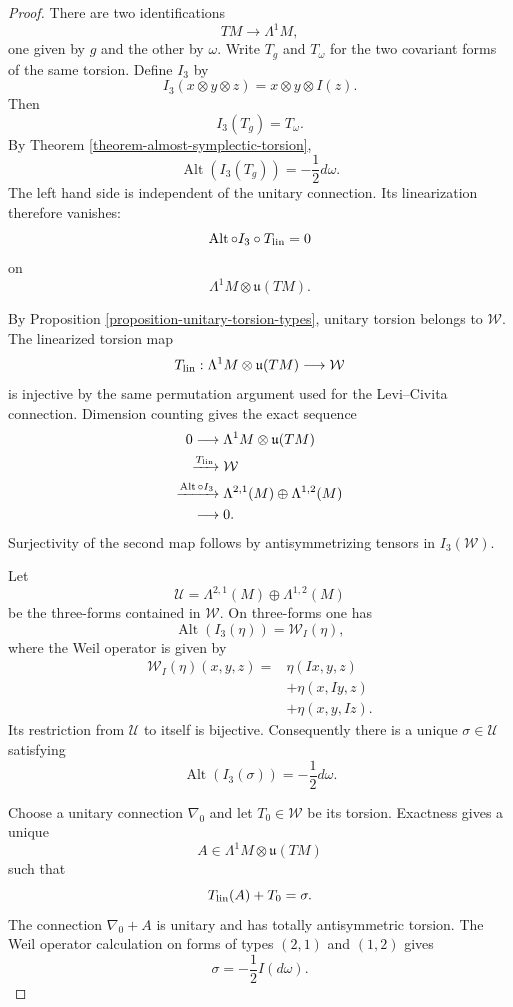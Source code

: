 \begin{proof}
There are two identifications
$$
TM\longrightarrow\Lambda^1M,
$$
one given by $g$ and the other by $\omega$.
Write $T_g$ and $T_\omega$ for the two
covariant forms of the same torsion. Define
$I_3$ by
$$
I_3(x\otimes y\otimes z)
=x\otimes y\otimes I(z).
$$
Then
$$
I_3(T_g)=T_\omega.
$$
By Theorem
\ref{theorem-almost-symplectic-torsion},
$$
\operatorname{Alt}(I_3(T_g))
=-\frac{1}{2}d\omega.
$$
The left hand side is independent of the
unitary connection. Its linearization
therefore vanishes:
$$
\operatorname{Alt}\circ I_3\circ
T_{\rm lin}=0
$$
on
$$
\Lambda^1M\otimes\mathfrak{u}(TM).
$$

By Proposition
\ref{proposition-unitary-torsion-types},
unitary torsion belongs to $\mathcal{W}$.
The linearized torsion map
$$
T_{\rm lin}:
\Lambda^1M\otimes\mathfrak{u}(TM)
\longrightarrow\mathcal{W}
$$
is injective by the same permutation
argument used for the Levi--Civita
connection. Dimension counting gives the
exact sequence
$$
\begin{aligned}
0\longrightarrow{}&
\Lambda^1M\otimes\mathfrak{u}(TM)\\
\xrightarrow{T_{\rm lin}}{}&
\mathcal{W}\\
\xrightarrow{\operatorname{Alt}\circ I_3}{}&
\Lambda^{2,1}(M)\oplus\Lambda^{1,2}(M)\\
\longrightarrow{}&0.
\end{aligned}
$$
Surjectivity of the second map follows by
antisymmetrizing tensors in
$I_3(\mathcal{W})$.

Let
$$
\mathcal{U}
=\Lambda^{2,1}(M)\oplus\Lambda^{1,2}(M)
$$
be the three-forms contained in
$\mathcal{W}$. On three-forms one has
$$
\operatorname{Alt}(I_3(\eta))
=\mathcal{W}_I(\eta),
$$
where the Weil operator is given by
$$
\begin{aligned}
\mathcal{W}_I(\eta)(x,y,z)
={}&\eta(Ix,y,z)\\
&+\eta(x,Iy,z)\\
&+\eta(x,y,Iz).
\end{aligned}
$$
Its restriction from $\mathcal{U}$ to
itself is bijective. Consequently there is
a unique $\sigma\in\mathcal{U}$ satisfying
$$
\operatorname{Alt}(I_3(\sigma))
=-\frac{1}{2}d\omega.
$$

Choose a unitary connection $\nabla_0$ and
let $T_0\in\mathcal{W}$ be its torsion.
Exactness gives a unique
$$
A\in\Lambda^1M\otimes\mathfrak{u}(TM)
$$
such that
$$
T_{\rm lin}(A)+T_0=\sigma.
$$
The connection $\nabla_0+A$ is unitary and
has totally antisymmetric torsion. The Weil
operator calculation on forms of types
$(2,1)$ and $(1,2)$ gives
$$
\sigma=-\frac{1}{2}I(d\omega).
$$
\end{proof}

